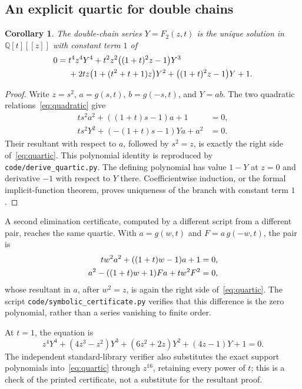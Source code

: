 \documentclass[11pt]{article}
\numberwithin{equation}{section}
\newtheorem{corollary}[theorem]{Corollary}
\theoremstyle{definition}
\newcommand{\Q}{\mathbb Q}
\begin{document}
\subsection{An explicit quartic for double chains}
\begin{corollary}
\label{cor:quartic}
The double-chain series $Y=F_2(z,t)$ is the unique solution in $\Q[t][[z]]$
with constant term $1$ of
\begin{align}
0={}&t^4z^4Y^4+t^2z^2\bigl((1+t)^2z-1\bigr)Y^3\notag\\
 &+2tz\bigl(1+(t^2+t+1)z\bigr)Y^2
    +\bigl((1+t)^2z-1\bigr)Y+1.
 \label{eq:quartic}
\end{align}
\end{corollary}
\begin{proof}
Write $z=s^2$, $a=g(s,t)$, $b=g(-s,t)$, and $Y=ab$. The two quadratic
relations~\eqref{eq:quadratic} give
\begin{align*}
 ts^2a^2+((1+t)s-1)a+1&=0,\\
 ts^2Y^2+(-(1+t)s-1)Ya+a^2&=0.
\end{align*}
Their resultant with respect to $a$, followed by $s^2=z$, is exactly the
right side of~\eqref{eq:quartic}. This polynomial identity is reproduced by
\texttt{code/derive\_quartic.py}. The defining polynomial has value $1-Y$
at $z=0$ and derivative $-1$ with respect to $Y$ there. Coefficientwise
induction, or the formal implicit-function theorem, proves uniqueness of the
branch with constant term $1$.
\end{proof}

A second elimination certificate, computed by a different script from a
different pair, reaches the same quartic. With $a=g(w,t)$ and $F=a\,g(-w,t)$,
the pair is
\begin{align}
 t w^2a^2+((1+t)w-1)a+1&=0,\notag\\
 a^2-((1+t)w+1)Fa+t w^2F^2&=0,
 \label{eq:quarticpair2}
\end{align}
whose resultant in $a$, after $w^2=z$, is again the right side
of~\eqref{eq:quartic}. The script
\texttt{code/sym\-bolic\_cer\-tif\-i\-cate.py} verifies
that this difference is the zero polynomial, rather than a series vanishing to
finite order.

At $t=1$, the equation is
\[
 z^4Y^4+(4z^3-z^2)Y^3+(6z^2+2z)Y^2+(4z-1)Y+1=0.
\]
The independent standard-library verifier also substitutes the exact support
polynomials into~\eqref{eq:quartic} through $z^{16}$, retaining every power of
$t$; this is a check of the printed certificate, not a substitute for the
resultant proof.
\end{document}
